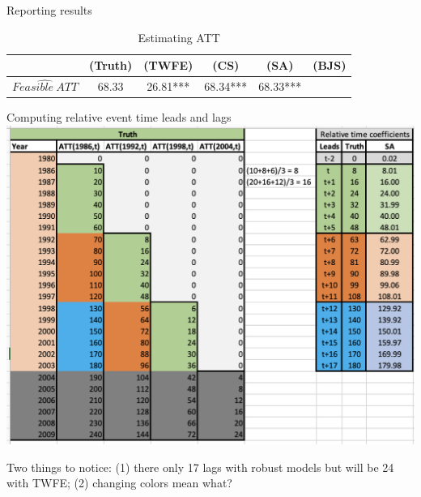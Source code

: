 \documentclass{beamer}
\begin{document}
\begin{frame}{Reporting results}
\begin{table}[htbp]\centering
\small
\caption{Estimating ATT}
\begin{center}
\begin{tabular}{l*{5}{c}}
\hline
\multicolumn{1}{l}{\textbf{}}&
\multicolumn{1}{c}{\textbf{(Truth)}}&
\multicolumn{1}{c}{\textbf{(TWFE)}}&
\multicolumn{1}{c}{\textbf{(CS)}}&
\multicolumn{1}{c}{\textbf{(SA)}}&
\multicolumn{1}{c}{\textbf{(BJS)}}\\
\hline
$\widehat{Feasible\ ATT}$  & 68.33    & 26.81*** & 68.34*** & 68.33***&\\
\hline
\end{tabular}
\end{center}
\end{table}

\end{frame}

\begin{frame}{Computing relative event time leads and lags }
             \includegraphics[scale=0.45]{./lecture_includes/sa_leads}

Two things to notice: (1) there only 17 lags with robust models but will be 24 with TWFE; (2) changing colors mean what?

\end{frame}
\end{document}
